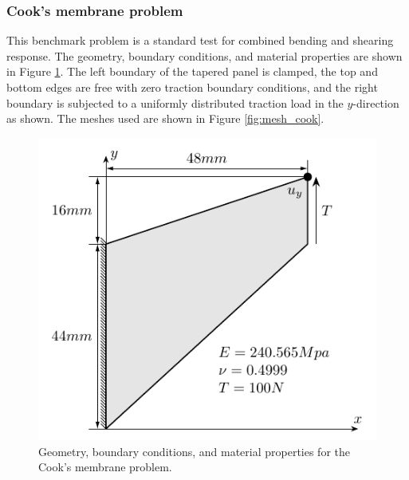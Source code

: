 \subsubsection{Cook's membrane problem}

This benchmark problem is a standard test for combined bending and shearing response. The geometry, boundary conditions, and material properties are shown in Figure \ref{fig:Cook's}. The left boundary of the tapered panel is clamped, the top and bottom edges are free with zero traction boundary conditions, and the right boundary is subjected to a uniformly distributed traction load in the $y$-direction as shown. The meshes used are shown in Figure \ref{fig:mesh_cook}.
\begin{figure}[htb!]
    \centering
    \includegraphics[width=0.5\linewidth]{Cook_s}
    \caption{Geometry, boundary conditions, and material properties for the Cook's membrane problem.}
    \label{fig:Cook's}
\end{figure}

